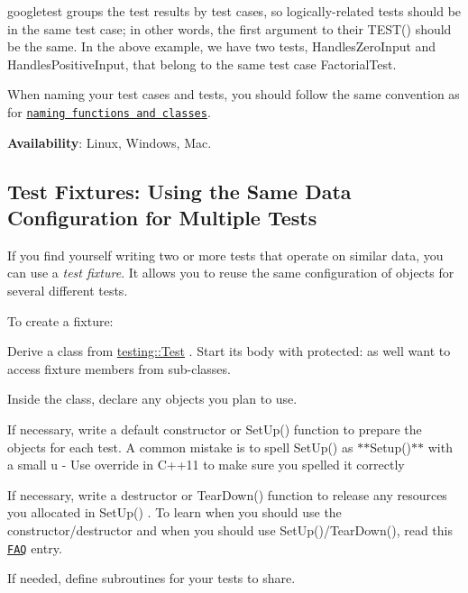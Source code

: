googletest groups the test results by test cases, so logically-\/related tests should be in the same test case; in other words, the first argument to their {\ttfamily T\+E\+S\+T()} should be the same. In the above example, we have two tests, {\ttfamily Handles\+Zero\+Input} and {\ttfamily Handles\+Positive\+Input}, that belong to the same test case {\ttfamily Factorial\+Test}.

When naming your test cases and tests, you should follow the same convention as for \href{https://google.github.io/styleguide/cppguide.html#Function_Names}{\tt naming functions and classes}.

{\bfseries Availability}\+: Linux, Windows, Mac.

\subsection*{Test Fixtures\+: Using the Same Data Configuration for Multiple Tests}

If you find yourself writing two or more tests that operate on similar data, you can use a {\itshape test fixture}. It allows you to reuse the same configuration of objects for several different tests.

To create a fixture\+:


\begin{DoxyEnumerate}
\item Derive a class from {\ttfamily \hyperlink{classtesting_1_1Test}{testing\+::\+Test}} . Start its body with {\ttfamily protected\+:} as we\textquotesingle{}ll want to access fixture members from sub-\/classes.
\end{DoxyEnumerate}
\begin{DoxyEnumerate}
\item Inside the class, declare any objects you plan to use.
\end{DoxyEnumerate}
\begin{DoxyEnumerate}
\item If necessary, write a default constructor or {\ttfamily Set\+Up()} function to prepare the objects for each test. A common mistake is to spell {\ttfamily Set\+Up()} as $\ast$$\ast${\ttfamily Setup()}$\ast$$\ast$ with a small {\ttfamily u} -\/ Use {\ttfamily override} in C++11 to make sure you spelled it correctly
\end{DoxyEnumerate}
\begin{DoxyEnumerate}
\item If necessary, write a destructor or {\ttfamily Tear\+Down()} function to release any resources you allocated in {\ttfamily Set\+Up()} . To learn when you should use the constructor/destructor and when you should use {\ttfamily Set\+Up()/\+Tear\+Down()}, read this \href{faq.md#should-i-use-the-constructordestructor-of-the-test-fixture-or-setupteardown}{\tt F\+AQ} entry.
\end{DoxyEnumerate}
\begin{DoxyEnumerate}
\item If needed, define subroutines for your tests to share.
\end{DoxyEnumerate}

